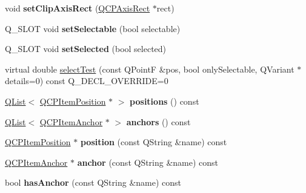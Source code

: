 \begin{DoxyCompactItemize}
void {\bfseries set\+Clip\+Axis\+Rect} (\hyperlink{class_q_c_p_axis_rect}{Q\+C\+P\+Axis\+Rect} $\ast$rect)
\item 
\mbox{\label{class_q_c_p_abstract_item_ab36e93c24bc9817f08260e34a38a8759}} 
Q\+\_\+\+S\+L\+OT void {\bfseries set\+Selectable} (bool selectable)
\item 
\mbox{\label{class_q_c_p_abstract_item_aa3d44aec4395fb95ee00e77dd13d8a39}} 
Q\+\_\+\+S\+L\+OT void {\bfseries set\+Selected} (bool selected)
\item 
virtual double \hyperlink{class_q_c_p_abstract_item_ae41d0349d68bb802c49104afd100ba2a}{select\+Test} (const Q\+PointF \&pos, bool only\+Selectable, Q\+Variant $\ast$details=0) const Q\+\_\+\+D\+E\+C\+L\+\_\+\+O\+V\+E\+R\+R\+I\+DE=0
\item 
\mbox{\label{class_q_c_p_abstract_item_aff2411599727dfd5744c2cdf816747cb}} 
\hyperlink{class_q_list}{Q\+List}$<$ \hyperlink{class_q_c_p_item_position}{Q\+C\+P\+Item\+Position} $\ast$ $>$ {\bfseries positions} () const
\item 
\mbox{\label{class_q_c_p_abstract_item_a2b8f7c4df3238e227c5f20a5358f0c3a}} 
\hyperlink{class_q_list}{Q\+List}$<$ \hyperlink{class_q_c_p_item_anchor}{Q\+C\+P\+Item\+Anchor} $\ast$ $>$ {\bfseries anchors} () const
\item 
\mbox{\label{class_q_c_p_abstract_item_a8df3c84f743e83dd8e7c061eba5c8e59}} 
\hyperlink{class_q_c_p_item_position}{Q\+C\+P\+Item\+Position} $\ast$ {\bfseries position} (const Q\+String \&name) const
\item 
\mbox{\label{class_q_c_p_abstract_item_ac4cac53fb6c8ba8d57500c198b2e350c}} 
\hyperlink{class_q_c_p_item_anchor}{Q\+C\+P\+Item\+Anchor} $\ast$ {\bfseries anchor} (const Q\+String \&name) const
\item 
\mbox{\label{class_q_c_p_abstract_item_a84914f4516f9b38ef0bd89eafe3dbda7}} 
bool {\bfseries has\+Anchor} (const Q\+String \&name) const
\end{DoxyCompactItemize}
